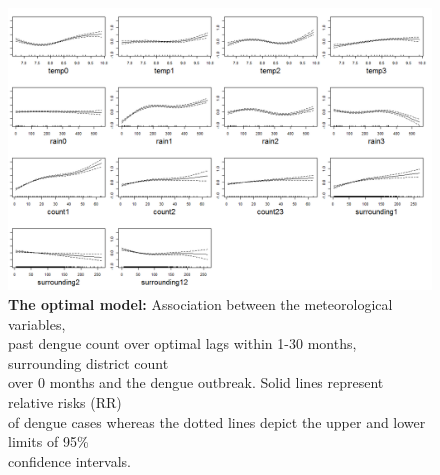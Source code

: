 \documentclass{bmcart}
\begin{document}
\begin{figure}[h!]
	\begin{center}
		\includegraphics[width= 0.97 \textwidth]{11-Fit-OptimalModel}
		\caption{\textbf{The optimal model:} Association between the meteorological variables, \\ past dengue count over optimal lags within 1-30 months, surrounding district count \\  over 0 months and the dengue outbreak. Solid lines represent relative risks (RR) \\ of dengue cases whereas the dotted lines depict the upper and lower limits of 95\% \\ confidence intervals.}
		\label{figure-mostOptimalFit}
	\end{center}
\end{figure}
\end{document}
